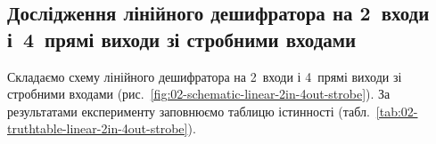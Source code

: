 \documentclass[a4paper,oneside,DIV=12,12pt,headings=normal]{scrartcl}
\begin{document}
			\begin{figure}[!htbp]
				\begin{floatrow}
				\end{floatrow}
			\end{figure}
			
		\subsection{Дослідження лінійного дешифратора на 2~входи і~4~прямі виходи зі стробними входами}
			Складаємо схему лінійного дешифратора на 2~входи і 4~прямі виходи зі стробними входами (рис.~\ref{fig:02-schematic-linear-2in-4out-strobe}). За результатами експерименту заповнюємо таблицю істинності (табл.~\ref{tab:02-truthtable-linear-2in-4out-strobe}).
			
\end{document}
